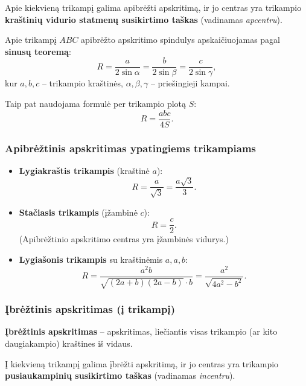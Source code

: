 \begin{theorem}
Apie kiekvieną trikampį galima apibrėžti apskritimą, ir jo centras yra trikampio \textbf{kraštinių vidurio statmenų susikirtimo taškas} (vadinamas \emph{apcentru}).
\end{theorem}

\begin{tcolorbox}[colback=blue!5!white, colframe=blue!60!black, title=Apibrėžtinio apskritimo spindulys]
Apie trikampį $ABC$ apibrėžto apskritimo spindulys apskaičiuojamas pagal \textbf{sinusų teoremą}:
\[
R = \frac{a}{2\sin\alpha} = \frac{b}{2\sin\beta} = \frac{c}{2\sin\gamma},
\]
kur $a, b, c$ – trikampio kraštinės, $\alpha, \beta, \gamma$ – priešingieji kampai.

Taip pat naudojama formulė per trikampio plotą $S$:
\[
R = \frac{abc}{4S}.
\]
\end{tcolorbox}

\subsubsection*{Apibrėžtinis apskritimas ypatingiems trikampiams}

\begin{itemize}
  \item \textbf{Lygiakraštis trikampis} (kraštinė $a$):
  \[
  R = \frac{a}{\sqrt{3}} = \frac{a\sqrt{3}}{3}.
  \]
  \item \textbf{Stačiasis trikampis} (įžambinė $c$):
  \[
  R = \frac{c}{2}.
  \]
  (Apibrėžtinio apskritimo centras yra įžambinės vidurys.)
  \item \textbf{Lygiašonis trikampis} su kraštinėmis $a, a, b$:
  \[
  R = \frac{a^2 b}{\sqrt{(2a+b)(2a-b)}\cdot b} = \frac{a^2}{\sqrt{4a^2 - b^2}}.
  \]
\end{itemize}

\subsubsection*{Įbrėžtinis apskritimas (į trikampį)}

\begin{definition}
\textbf{Įbrėžtinis apskritimas} – apskritimas, liečiantis visas trikampio (ar kito daugiakampio) kraštines iš vidaus.
\end{definition}

\begin{theorem}
Į kiekvieną trikampį galima įbrėžti apskritimą, ir jo centras yra trikampio \textbf{pusiaukampinių susikirtimo taškas} (vadinamas \emph{incentru}).
\end{theorem}

